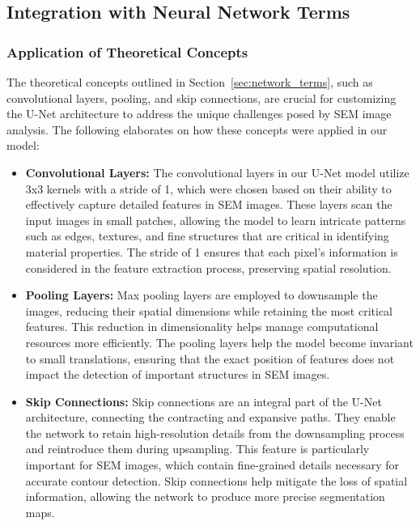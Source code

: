 \documentclass[preprint,12pt]{elsarticle}
\begin{document}
\begin{itemize}
\subsection{Integration with Neural Network Terms}
\label{subsec:IntegrationNeuralNetworkTerms}

\subsubsection{Application of Theoretical Concepts}
The theoretical concepts outlined in Section~\ref{sec:network_terms}, such as convolutional layers, pooling, and skip connections, are crucial for customizing the U-Net architecture to address the unique challenges posed by SEM image analysis. The following elaborates on how these concepts were applied in our model:

\begin{itemize}
    \item \textbf{Convolutional Layers:} The convolutional layers in our U-Net model utilize 3x3 kernels with a stride of 1, which were chosen based on their ability to effectively capture detailed features in SEM images. These layers scan the input images in small patches, allowing the model to learn intricate patterns such as edges, textures, and fine structures that are critical in identifying material properties. The stride of 1 ensures that each pixel's information is considered in the feature extraction process, preserving spatial resolution.

    \item \textbf{Pooling Layers:} Max pooling layers are employed to downsample the images, reducing their spatial dimensions while retaining the most critical features. This reduction in dimensionality helps manage computational resources more efficiently. The pooling layers help the model become invariant to small translations, ensuring that the exact position of features does not impact the detection of important structures in SEM images.

    \item \textbf{Skip Connections:} Skip connections are an integral part of the U-Net architecture, connecting the contracting and expansive paths. They enable the network to retain high-resolution details from the downsampling process and reintroduce them during upsampling. This feature is particularly important for SEM images, which contain fine-grained details necessary for accurate contour detection. Skip connections help mitigate the loss of spatial information, allowing the network to produce more precise segmentation maps.


\end{itemize}
\end{itemize}
\end{document}
